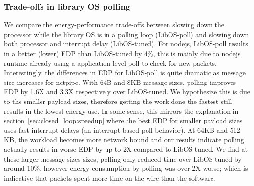 \subsubsection{Trade-offs in library OS polling}
We compare the energy-performance trade-offs between slowing down the processor while the library OS is in a polling loop (LibOS-poll) and slowing down both processor and interrupt delay (LibOS-tuned). For nodejs, LibOS-poll results in a better (lower) EDP than LibOS-tuned by 4\%, this is mainly due to nodejs runtime already using a application level poll to check for new packets. Interestingly, the differences in EDP for LibOS-poll is quite dramatic as message size increases for netpipe. With 64B and 8KB message sizes, polling improves EDP by 1.6X and 3.3X respectively over LibOS-tuned. We hypothesize this is due to the smaller payload sizes, therefore getting the work done the fastest still results in the lowest energy use. In some sense, this mirrors the explanation in section~\ref{sec:closed_loop:speedup} where the best EDP for smaller payload sizes uses fast interrupt delays (an interrupt-based poll behavior). At 64KB and 512 KB, the workload becomes more network bound and our results indicate polling actually results in worse EDP by up to 2X compared to LibOS-tuned. We find at these larger message sizes sizes, polling only reduced time over LibOS-tuned by around 10\%, however energy consumption by polling was over 2X worse; which is indicative that packets spent more time on the wire than the software.

